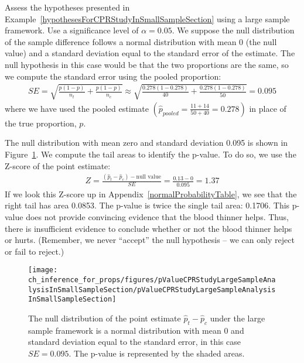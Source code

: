 \begin{example}{Assess the hypotheses presented in Example~\ref{hypothesesForCPRStudyInSmallSampleSection} using a large sample framework. Use a significance level of $\alpha=0.05$.}
We suppose the null distribution of the sample difference follows a normal distribution with mean 0 (the null value) and a standard deviation equal to the standard error of the estimate. The null hypothesis in this case would be that the two proportions are the same, so we compute the standard error using the pooled proportion:
\begin{align*}
SE = \sqrt{\frac{p(1-p)}{n_t} + \frac{p(1-p)}{n_c}}
	\approx \sqrt{\frac{0.278(1-0.278)}{40} + \frac{0.278(1-0.278)}{50}} = 0.095
\end{align*}
where we have used the pooled estimate $\left( \hat{p}_{\textit{pooled}} = \frac{11+14}{50 + 40} = 0.278 \right)$ in place of the true proportion, $p$.

The null distribution with mean zero and standard deviation 0.095 is shown in Figure~\ref{pValueCPRStudyLargeSampleAnalysisInSmallSampleSection}. We compute the tail areas to identify the p-value. To do so, we use the Z-score of the point estimate:
\begin{align*}
Z = \frac{(\hat{p}_t - \hat{p}_c) - \text{null value}}{SE} = \frac{0.13 - 0}{0.095} = 1.37
\end{align*}
If we look this Z-score up in Appendix~\ref{normalProbabilityTable}, we see that the right tail has area 0.0853. The p-value is twice the single tail area: 0.1706. This p-value does not provide convincing evidence that the blood thinner helps. Thus, there is insufficient evidence to conclude whether or not the blood thinner helps or hurts. (Remember, we never ``accept'' the null hypothesis -- we can only reject or fail to reject.)
\end{example}
\begin{figure}[ht]
\centering
\texttt{[image: ch\_inference\_for\_props/figures/pValueCPRStudyLargeSampleAnalysisInSmallSampleSection/pValueCPRStudyLargeSampleAnalysisInSmallSampleSection]}
\caption{The null distribution of the point estimate $\hat{p}_t - \hat{p}_c$ under the large sample framework is a normal distribution with mean $0$ and standard deviation equal to the standard error, in this case $SE=0.095$. The p-value is represented by the shaded areas.}
\label{pValueCPRStudyLargeSampleAnalysisInSmallSampleSection}
\end{figure}

